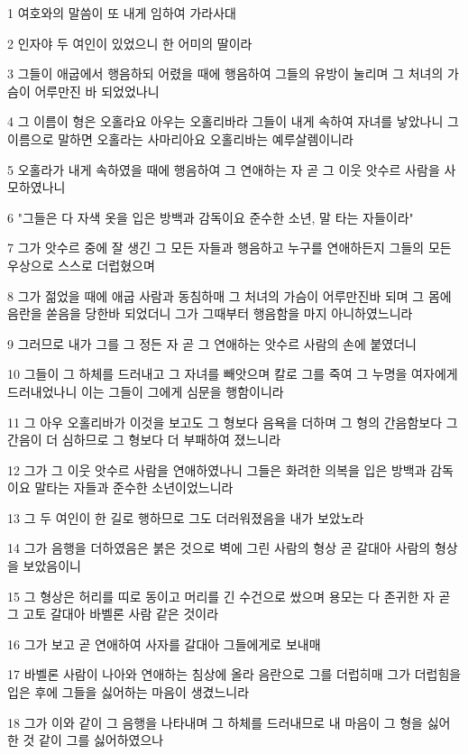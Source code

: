 \par 1 여호와의 말씀이 또 내게 임하여 가라사대
\par 2 인자야 두 여인이 있었으니 한 어미의 딸이라
\par 3 그들이 애굽에서 행음하되 어렸을 때에 행음하여 그들의 유방이 눌리며 그 처녀의 가슴이 어루만진 바 되었었나니
\par 4 그 이름이 형은 오홀라요 아우는 오홀리바라 그들이 내게 속하여 자녀를 낳았나니 그 이름으로 말하면 오홀라는 사마리아요 오홀리바는 예루살렘이니라
\par 5 오홀라가 내게 속하였을 때에 행음하여 그 연애하는 자 곧 그 이웃 앗수르 사람을 사모하였나니
\par 6 "그들은 다 자색 옷을 입은 방백과 감독이요 준수한 소년, 말 타는 자들이라"
\par 7 그가 앗수르 중에 잘 생긴 그 모든 자들과 행음하고 누구를 연애하든지 그들의 모든 우상으로 스스로 더럽혔으며
\par 8 그가 젊었을 때에 애굽 사람과 동침하매 그 처녀의 가슴이 어루만진바 되며 그 몸에 음란을 쏟음을 당한바 되었더니 그가 그때부터 행음함을 마지 아니하였느니라
\par 9 그러므로 내가 그를 그 정든 자 곧 그 연애하는 앗수르 사람의 손에 붙였더니
\par 10 그들이 그 하체를 드러내고 그 자녀를 빼앗으며 칼로 그를 죽여 그 누명을 여자에게 드러내었나니 이는 그들이 그에게 심문을 행함이니라
\par 11 그 아우 오홀리바가 이것을 보고도 그 형보다 음욕을 더하며 그 형의 간음함보다 그 간음이 더 심하므로 그 형보다 더 부패하여 졌느니라
\par 12 그가 그 이웃 앗수르 사람을 연애하였나니 그들은 화려한 의복을 입은 방백과 감독이요 말타는 자들과 준수한 소년이었느니라
\par 13 그 두 여인이 한 길로 행하므로 그도 더러워졌음을 내가 보았노라
\par 14 그가 음행을 더하였음은 붉은 것으로 벽에 그린 사람의 형상 곧 갈대아 사람의 형상을 보았음이니
\par 15 그 형상은 허리를 띠로 동이고 머리를 긴 수건으로 쌌으며 용모는 다 존귀한 자 곧 그 고토 갈대아 바벨론 사람 같은 것이라
\par 16 그가 보고 곧 연애하여 사자를 갈대아 그들에게로 보내매
\par 17 바벨론 사람이 나아와 연애하는 침상에 올라 음란으로 그를 더럽히매 그가 더럽힘을 입은 후에 그들을 싫어하는 마음이 생겼느니라
\par 18 그가 이와 같이 그 음행을 나타내며 그 하체를 드러내므로 내 마음이 그 형을 싫어한 것 같이 그를 싫어하였으나
